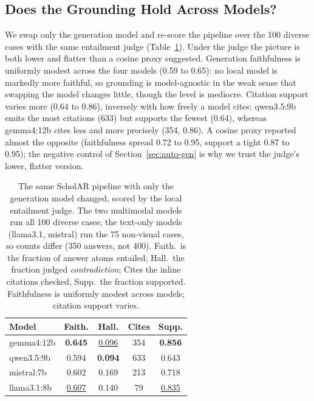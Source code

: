 \documentclass[letterpaper]{article} %
\newcommand{\best}[1]{\textbf{#1}}
\newcommand{\snd}[1]{\underline{#1}}
\begin{document}
\subsection{Does the Grounding Hold Across Models?}
\label{sec:auto-models}
We swap only the generation model and re-score the pipeline over the 100 diverse cases with the
same entailment judge (Table~\ref{tab:models}). Under the judge the picture is both lower and
flatter than a cosine proxy suggested. Generation faithfulness is uniformly modest across the
four models (0.59 to 0.65): no local model is markedly more faithful, so grounding is
model-agnostic in the weak sense that swapping the model changes little, though the level is
mediocre. Citation support varies more (0.64 to 0.86), inversely with how freely a model cites:
qwen3.5:9b emits the most citations (633) but supports the fewest (0.64), whereas gemma4:12b cites
less and more precisely (354, 0.86). A cosine proxy reported almost the opposite (faithfulness
spread 0.72 to 0.95, support a tight 0.87 to 0.95); the negative control of
Section~\ref{sec:auto-gen} is why we trust the judge's lower, flatter version.

\begin{table}[t]
  \centering
  \caption{The same ScholAR pipeline with only the generation model changed, scored by the local
           entailment judge. The two multimodal models run all 100 diverse cases; the text-only
           models (llama3.1, mistral) run the 75 non-visual cases, so counts differ (350 answers,
           not 400). Faith.\ is the fraction of answer atoms entailed; Hall.\ the fraction judged
           \emph{contradiction}; Cites the inline citations checked, Supp.\ the fraction supported.
           Faithfulness is uniformly modest across models; citation support varies.}
  \label{tab:models}
  \setlength{\tabcolsep}{5pt}
  \begin{tabular}{lcccc}
    \toprule
    \textbf{Model} & \textbf{Faith.} & \textbf{Hall.} & \textbf{Cites} & \textbf{Supp.} \\
    \midrule
    gemma4:12b   & \best{0.645} & \snd{0.096} & 354 & \best{0.856} \\
    qwen3.5:9b   & 0.594 & \best{0.094} & 633 & 0.643 \\
    mistral:7b   & 0.602 & 0.169 & 213 & 0.718 \\
    llama3.1:8b  & \snd{0.607} & 0.140 &  79 & \snd{0.835} \\
    \bottomrule
  \end{tabular}
\end{table}
\end{document}
